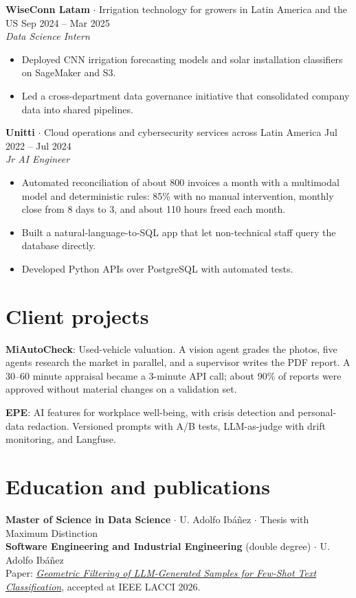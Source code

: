 \documentclass[a4paper,10pt]{article}
\begin{document}
\textbf{WiseConn Latam} $\cdot$ Irrigation technology for growers in Latin America and the US \hfill Sep 2024 -- Mar 2025\\
\textit{Data Science Intern}
\begin{itemize}
\item Deployed CNN irrigation forecasting models and solar installation classifiers on SageMaker and S3.
\item Led a cross-department data governance initiative that consolidated company data into shared pipelines.
\end{itemize}
\textbf{Unitti} $\cdot$ Cloud operations and cybersecurity services across Latin America \hfill Jul 2022 -- Jul 2024\\
\textit{Jr AI Engineer}
\begin{itemize}
\item Automated reconciliation of about 800 invoices a month with a multimodal model and deterministic rules: 85\% with no manual intervention, monthly close from 8 days to 3, and about 110 hours freed each month.
\item Built a natural-language-to-SQL app that let non-technical staff query the database directly.
\item Developed Python APIs over PostgreSQL with automated tests.
\end{itemize}
\section*{Client projects}
\textbf{MiAutoCheck}: Used-vehicle valuation. A vision agent grades the photos, five agents research the market in parallel, and a supervisor writes the PDF report. A 30--60 minute appraisal became a 3-minute API call; about 90\% of reports were approved without material changes on a validation set.

\textbf{EPE}: AI features for workplace well-being, with crisis detection and personal-data redaction. Versioned prompts with A/B tests, LLM-as-judge with drift monitoring, and Langfuse.
\section*{Education and publications}
\textbf{Master of Science in Data Science} $\cdot$ U. Adolfo Ibáñez $\cdot$ Thesis with Maximum Distinction\\
\textbf{Software Engineering and Industrial Engineering} (double degree) $\cdot$ U. Adolfo Ibáñez\\
Paper: \href{https://arxiv.org/abs/2608.13866}{\textit{Geometric Filtering of LLM-Generated Samples for Few-Shot Text Classification}}, accepted at IEEE LACCI 2026.
\end{document}
